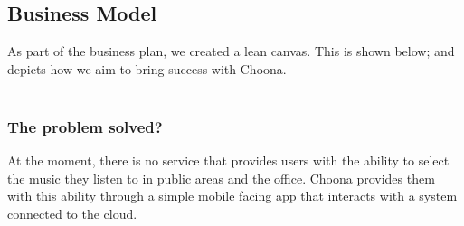 \subsection{Business Model}
As part of the business plan, we created a lean canvas.  This is shown below; and depicts how we aim to bring success with Choona.\\

\noindent{}\\

\subsubsection{The problem solved?}
At the moment, there is no service that provides users with the ability to select the music they listen to in public areas and the office.  Choona provides them with this ability through a simple mobile facing app that interacts with a system connected to the cloud.   \\

